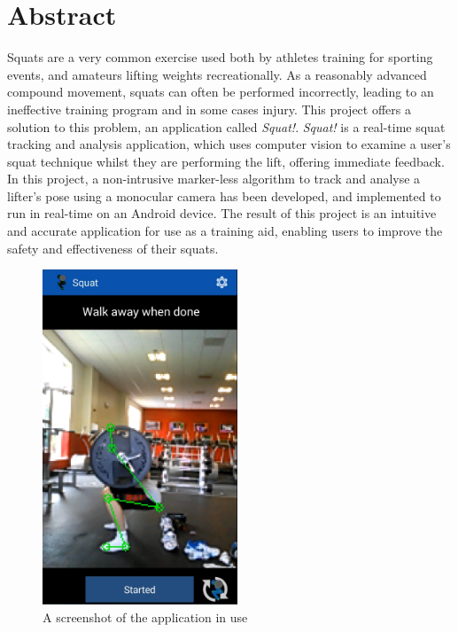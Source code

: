 \section{Abstract}

Squats are a very common exercise used both by athletes training for sporting events, and amateurs lifting weights recreationally. As a reasonably advanced compound movement, squats can often be performed incorrectly, leading to an ineffective training program and in some cases injury. This project offers a solution to this problem, an application called \emph{Squat!}. \emph{Squat!} is a real-time squat tracking and analysis application, which uses computer vision to examine a user's squat technique whilst they are performing the lift, offering immediate feedback. In this project, a non-intrusive marker-less algorithm to track and analyse a lifter's pose using a monocular camera has been developed, and implemented to run in real-time on an Android device. The result of this project is an intuitive and accurate application for use as a training aid, enabling users to improve the safety and effectiveness of their squats.

\begin{figure}[H]
    \centering
	\includegraphics[height=10cm]{application/images/belowparallel}
\caption{A screenshot of the application in use}
\label{fig:preview}
\end{figure}